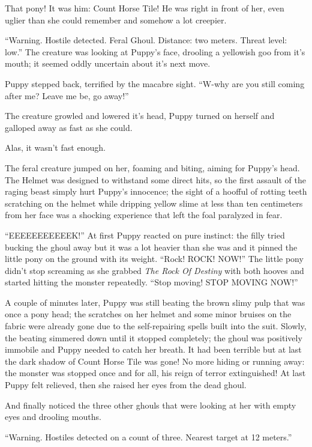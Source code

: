 That pony! It was him: Count Horse Tile! He was right in front of her, even uglier than she could remember and somehow a lot creepier.

``{\mt Warning. Hostile detected. Feral Ghoul. Distance: two meters. Threat level: low.}'' The creature was looking at Puppy's face, drooling a yellowish goo from it's mouth; it seemed oddly uncertain about it's next move.

Puppy stepped back, terrified by the macabre sight. ``W-why are you still coming after me? Leave me be, go away!''

The creature growled and lowered it's head, Puppy turned on herself and galloped away as fast as she could.

Alas, it wasn't fast enough.

The feral creature jumped on her, foaming and biting, aiming for Puppy's head. The Helmet was designed to withstand some direct hits, so the first assault of the raging beast simply hurt Puppy's innocence; the sight of a hoofful of rotting teeth scratching on the helmet while dripping yellow slime at less than ten centimeters from her face was a shocking experience that left the foal paralyzed in fear.

``EEEEEEEEEEEK!'' At first Puppy reacted on pure instinct: the filly tried bucking the ghoul away but it was a lot heavier than she was and it pinned the little pony on the ground with its weight. ``Rock! ROCK! NOW!'' The little pony didn't stop screaming as she grabbed \emph{The Rock Of Destiny} with both hooves and started hitting the monster repeatedly. ``Stop moving! STOP MOVING NOW!''

A couple of minutes later, Puppy was still beating the brown slimy pulp that was once a pony head; the scratches on her helmet and some minor bruises on the fabric were already gone due to the self-repairing spells built into the suit. Slowly, the beating simmered down until it stopped completely; the ghoul was positively immobile and Puppy needed to catch her breath. It had been terrible but at last the dark shadow of Count Horse Tile was gone! No more hiding or running away: the monster was stopped once and for all, his reign of terror extinguished! At last Puppy felt relieved, then she raised her eyes from the dead ghoul.

And finally noticed the three other ghouls that were looking at her with empty eyes and drooling mouths.

``{\mt Warning. Hostiles detected on a count of three. Nearest target at 12 meters.}''

